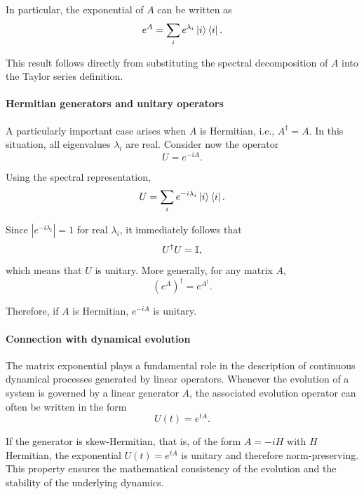 In particular, the exponential of $A$ can be written as
\begin{equation}
    e^A = \sum_i e^{\lambda_i} \ket{i}\bra{i}.
\end{equation}

This result follows directly from substituting the spectral decomposition of $A$ into the Taylor series definition.

\paragraph{Hermitian generators and unitary operators}
A particularly important case arises when $A$ is Hermitian, i.e., $A^\dagger = A$. In this situation, all eigenvalues $\lambda_i$ are real. Consider now the operator
\begin{equation}
    U = e^{-iA}.
\end{equation}

Using the spectral representation,
\begin{equation}
    U = \sum_i e^{-i\lambda_i} \ket{i}\bra{i}.
\end{equation}

Since $|e^{-i\lambda_i}| = 1$ for real $\lambda_i$, it immediately follows that
\begin{equation}
    U^\dagger U = \mathbb{I},
\end{equation}
which means that $U$ is unitary. More generally, for any matrix $A$,
\begin{equation}
    \left(e^A\right)^\dagger = e^{A^\dagger}.
\end{equation}

Therefore, if $A$ is Hermitian, $e^{-iA}$ is unitary.

\paragraph{Connection with dynamical evolution}
The matrix exponential plays a fundamental role in the description of continuous dynamical processes generated by linear operators. Whenever the evolution of a system is governed by a linear generator $A$, the associated evolution operator can often be written in the form
\begin{equation}
    U(t) = e^{tA}.
\end{equation}

If the generator is skew-Hermitian, that is, of the form $A = -iH$ with $H$ Hermitian, the exponential $U(t) = e^{tA}$ is unitary and therefore norm-preserving. This property ensures the mathematical consistency of the evolution and the stability of the underlying dynamics.

